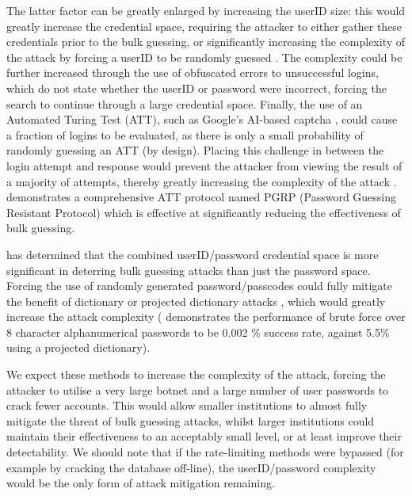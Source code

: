 \documentclass[british,11pt,a4paper]{article}
\begin{document}
The latter factor can be greatly enlarged by increasing the userID size: this would greatly increase the credential space, requiring the attacker to either gather these credentials prior to the bulk guessing, or significantly increasing the complexity of the attack by forcing a userID to be randomly guessed \cite{Kosamkar_undated-ik}. The complexity could be further increased through the use of obfuscated errors to unsuccessful logins, which do not state whether the userID or password were incorrect, forcing the search to continue through a large credential space. Finally, the use of an Automated Turing Test (ATT), such as Google's AI-based captcha \cite{noauthor_undated-lk}, could cause a fraction of logins to be evaluated, as there is only a small probability of randomly guessing an ATT (by design). Placing this challenge in between the login attempt and response would prevent the attacker from viewing the result of a majority of attempts, thereby greatly increasing the complexity of the attack \cite{Alsaleh2012-ek}. \citet{Alsaleh2012-ek} demonstrates a comprehensive ATT protocol named PGRP (Password Guessing Resistant Protocol) which is effective at significantly reducing the effectiveness of bulk guessing.

\citet{Florencio2007-yp} has determined that the combined userID/password credential space is more significant in deterring bulk guessing attacks than just the password space. Forcing the use of randomly generated password/passcodes could fully mitigate the benefit of dictionary or projected dictionary attacks \cite{Kosamkar_undated-ik}, which would greatly increase the attack complexity (\citet{Aspinall2013-sh} demonstrates the performance of brute force over 8 character alphanumerical passwords to be 0.002 \% success rate, against 5.5\% using a projected dictionary).

We expect these methods to increase the complexity of the attack, forcing the attacker to utilise a very large botnet and a large number of user passwords to crack fewer accounts. This would allow smaller institutions to almost fully mitigate the threat of bulk guessing attacks, whilst larger institutions could maintain their effectiveness to an acceptably small level, or at least improve their detectability. We should note that if the rate-limiting methods were bypassed (for example by cracking the database off-line), the userID/password complexity would be the only form of attack mitigation remaining.
\end{document}
